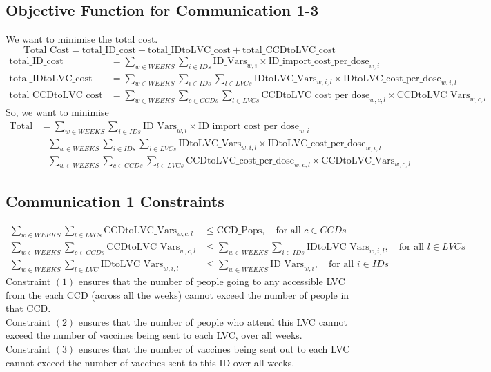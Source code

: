 \documentclass[12pt]{article}
\begin{document}
    \subsection{Objective Function for Communication 1-3}
        We want to minimise the total cost.\\
        \[\text{Total Cost} = \text{total\_ID\_cost} + \text{total\_IDtoLVC\_cost} + \text{total\_CCDtoLVC\_cost}\]
        \begin{align*}
            \text{total\_ID\_cost} &= \sum_{w \in WEEKS}\sum_{i\in IDs}\text{ID\_Vars}_{w,i}\times \text{ID\_import\_cost\_per\_dose}_{w,i}\\
            \text{total\_IDtoLVC\_cost} &= \sum_{w\in WEEKS}\sum_{i\in IDs}\sum_{l\in LVCs}\text{IDtoLVC\_Vars}_{w,i,l}\times \text{IDtoLVC\_cost\_per\_dose}_{w,i,l}\\
            \text{total\_CCDtoLVC\_cost} &= \sum_{w\in WEEKS}\sum_{c\in CCDs}\sum_{l\in LVCs}\text{CCDtoLVC\_cost\_per\_dose}_{w,c,l}\times\text{CCDtoLVC\_Vars}_{w,c,l}
        \end{align*}
        So, we want to minimise 
        \begin{align*}
            \text{Total Cost} &= \sum_{w \in WEEKS}\sum_{i\in IDs}\text{ID\_Vars}_{w,i}\times \text{ID\_import\_cost\_per\_dose}_{w,i}\\
            &+ \sum_{w\in WEEKS}\sum_{i\in IDs}\sum_{l\in LVCs}\text{IDtoLVC\_Vars}_{w,i,l}\times \text{IDtoLVC\_cost\_per\_dose}_{w,i,l}\\
            &+ \sum_{w\in WEEKS}\sum_{c\in CCDs}\sum_{l\in LVCs}\text{CCDtoLVC\_cost\_per\_dose}_{w,c,l}\times\text{CCDtoLVC\_Vars}_{w,c,l}
        \end{align*}
    \subsection{Communication 1 Constraints}
        \begin{align}
            \displaystyle\sum_{w\in WEEKS}\displaystyle\sum_{l\in LVCs} \text{CCDtoLVC\_Vars}_{w,c,l} & \le \text{CCD\_Pops}, \quad \text{for all } c \in CCDs\\
            \displaystyle\sum_{w\in WEEKS}\displaystyle\sum_{c\in CCDs} \text{CCDtoLVC\_Vars}_{w,c,l} &\le \displaystyle\sum_{w\in WEEKS}\displaystyle\sum_{i \in IDs} \text{IDtoLVC\_Vars}_{w,i,l}, \quad \text{for all } l \in LVCs\\
            \displaystyle\sum_{w\in WEEKS}\displaystyle\sum_{l\in LVC}\text{IDtoLVC\_Vars}_{w,i,l} &\le \displaystyle\sum_{w\in WEEKS}\text{ID\_Vars}_{w,i}, \quad \text{for all } i \in IDs
        \end{align}
	Constraint \((1)\) ensures that the number of people going to any accessible LVC from the each CCD (across all the weeks) cannot exceed the number of people in that CCD.\\
        Constraint \((2)\) ensures that the number of people who attend this LVC cannot exceed the number of vaccines being sent to each LVC, over all weeks.\\
        Constraint \((3)\) ensures that the number of vaccines being sent out to each LVC cannot exceed the number of vaccines sent to this ID over all weeks.
\end{document}
